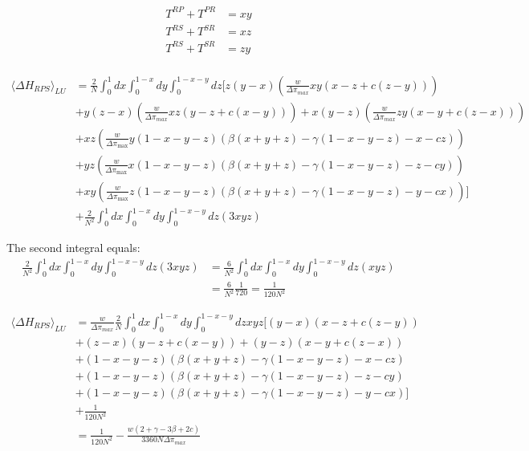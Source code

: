 \documentclass[./main.tex]{subfiles}
\begin{document}
\begin{align}
T^{RP} + T^{PR} &= xy \nonumber \\
T^{RS} + T^{SR} &= xz \nonumber \\
T^{RS} + T^{SR} &= zy \nonumber \\\nonumber
\end{align} 


\begin{align}
\langle \Delta H_{RPS} \rangle_{LU} &= \frac{2}{N} \int_{0}^{1}dx \int_{0}^{1-x} dy \int_{0}^{1-x-y}dz 
\Big[z(y-x)(\frac{w}{\Delta \pi_{max}}xy(x - z + c(z-y)))  \nonumber\\
&+ y(z-x)(\frac{w}{\Delta \pi_{max}}xz(y - z + c(x-y))) + x(y-z)(\frac{w}{\Delta \pi_{max}}zy(x - y + c(z-x)))  \nonumber\\
&+ xz(\frac{w}{\Delta \pi_{\text{max}}} y(1-x-y-z)\left(\beta(x+y+z) - \gamma(1-x-y-z) -x -cz\right))  \nonumber\\
&+ yz(\frac{w}{\Delta \pi_{\text{max}}} x(1-x-y-z)\left(\beta(x+y+z) - \gamma(1-x-y-z) -z -cy\right)) \nonumber \\
& + xy(\frac{w}{\Delta \pi_{\text{max}}} z(1-x-y-z)\left(\beta(x+y+z) - \gamma(1-x-y-z) -y -cx\right))
\Big] \nonumber \\
&+ \frac{2}{N^2} \int_{0}^{1}dx \int_{0}^{1-x} dy \int_{0}^{1-x-y}dz\left(
3xyz\right) \nonumber
\end{align}

The second integral equals:
\begin{align}
\frac{2}{N^2} \int_{0}^{1}dx \int_{0}^{1-x} dy \int_{0}^{1-x-y}dz\left(
3xyz\right) &= \frac{6}{N^2} \int_{0}^{1}dx \int_{0}^{1-x} dy \int_{0}^{1-x-y}dz\left(
xyz\right) \nonumber\\
&= \frac{6}{N^2} \frac{1}{720} = \frac{1}{120N^2}\nonumber
\end{align}


\begin{align}
\langle \Delta H_{RPS} \rangle_{LU} &= \frac{w}{\Delta \pi_{max}} \frac{2}{N} \int_{0}^{1}dx \int_{0}^{1-x} dy \int_{0}^{1-x-y}dz 
xyz \Big[(y-x)(x - z + c(z-y))  \nonumber\\
&+ (z-x)(y - z + c(x-y)) + (y-z)(x - y + c(z-x)) \nonumber\\
&+ (1-x-y-z)\left(\beta(x+y+z) - \gamma(1-x-y-z) -x -cz\right) \nonumber\\
&+ (1-x-y-z)\left(\beta(x+y+z) - \gamma(1-x-y-z) -z -cy\right) \nonumber \\
& + (1-x-y-z)\left(\beta(x+y+z) - \gamma(1-x-y-z) -y -cx\right)
\Big] \nonumber \\
&+ \frac{1}{120N^2} \nonumber \\
&= \frac{1}{120N^2} - \frac{w(2 + \gamma - 3 \beta  + 2c)}{3360 N \Delta \pi_{max}}
\end{align}
\end{document}

